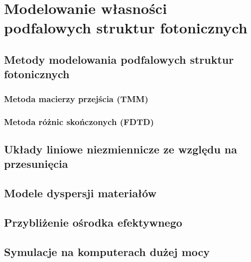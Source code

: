 \chapter{\mbox{Modelowanie} \mbox{własności} \mbox{podfalowych} \mbox{struktur} \mbox{fotonicznych}}
\section{Metody modelowania podfalowych struktur fotonicznych}

\subsection{Metoda macierzy przejścia (TMM)}

\subsection{Metoda różnic skończonych (FDTD)}

\section{Układy liniowe niezmiennicze ze względu na przesunięcia}

\section{Modele dyspersji materiałów}

\section{Przybliżenie ośrodka efektywnego}

\section{Symulacje na komputerach dużej mocy}

